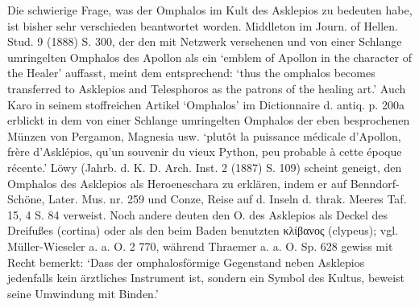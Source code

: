 \documentclass[a4paper, 11pt, oneside]{article}
\begin{document}
Die schwierige Frage, was der Omphalos im Kult des Asklepios zu bedeuten habe, ist bisher sehr verschieden beantwortet worden. Middleton im Journ. of Hellen. Stud. 9 (1888) S. 300, der den mit Netzwerk versehenen und von einer Schlange umringelten Omphalos des Apollon als ein `emblem of Apollon in the character of the Healer' auffasst, meint dem entsprechend: `thus the omphalos becomes transferred to Asklepios and Telesphoros as the patrons of the healing art.' Auch Karo in seinem stoffreichen Artikel `Omphalos' im Dictionnaire d. antiq. p. 200a erblickt in dem von einer Schlange umringelten Omphalos der eben besprochenen Münzen von Pergamon, Magnesia usw. `plutôt la puissance médicale d'Apollon, frère d'Asklépios, qu'un souvenir du vieux Python, peu probable à cette époque récente.' Löwy (Jahrb. d. K. D. Arch. Inst. 2 (1887) S. 109) scheint geneigt, den Omphalos des Asklepios als Heroeneschara zu erklären, indem er auf Benndorf-Schöne, Later. Mus. nr. 259 und Conze, Reise auf d. Inseln d. thrak. Meeres Taf. 15, 4 S. 84 verweist. Noch andere deuten den O. des Asklepios als Deckel des Dreifußes (cortina) oder als den beim Baden benutzten κλίβανος (clypeus); vgl. Müller-Wieseler a. a. O. 2 770, während Thraemer a. a. O. Sp. 628 gewiss mit Recht bemerkt: `Dass der omphalosförmige Gegenstand neben Asklepios jedenfalls kein ärztliches Instrument ist, sondern ein Symbol des Kultus, beweist seine Umwindung mit Binden.'
\end{document}
